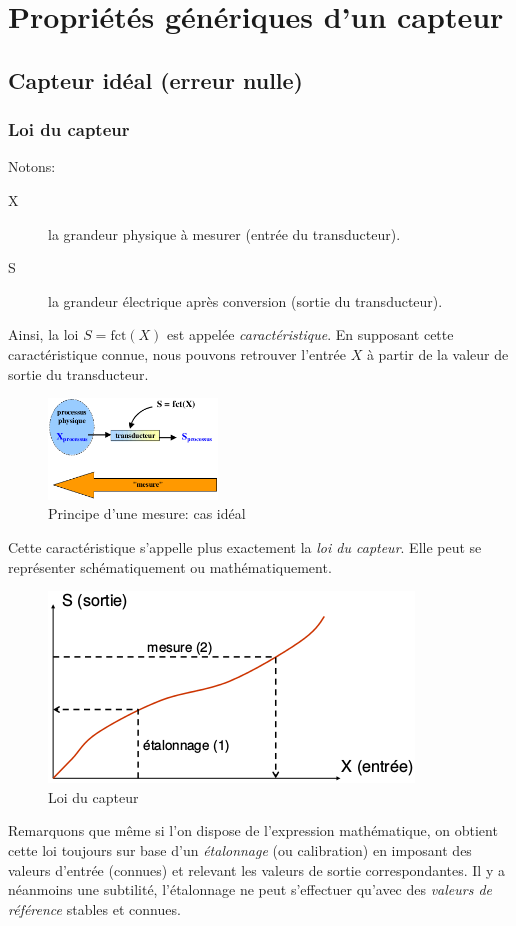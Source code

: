 \chapter{Propriétés génériques d'un capteur}
\section{Capteur idéal (erreur nulle)}
\subsection{Loi du capteur}
Notons:
\begin{description}
	\item[X] la grandeur physique à mesurer (entrée du transducteur).
	\item[S] la grandeur électrique après conversion (sortie du transducteur).
\end{description}
Ainsi, la loi \(S=\text{fct}(X)\) est appelée \emph{caractéristique}. En supposant cette caractéristique connue, nous pouvons retrouver l'entrée \(X\) à partir de la valeur de sortie du transducteur.
\begin{figure}[H] 
	\centering 
	\includegraphics[width=0.4\textwidth]{ch2/image1} 
	\caption{Principe d'une mesure: cas idéal}
\end{figure} 
Cette caractéristique s'appelle plus exactement la \emph{loi du capteur}. Elle peut se représenter schématiquement ou mathématiquement. 
\begin{figure}[H] 
	\centering 
	\includegraphics[width=.5\textwidth]{ch2/image2} 
	\caption{Loi du capteur}
\end{figure}
Remarquons que même si l'on dispose de l'expression mathématique, on obtient cette loi toujours sur base d'un \emph{étalonnage} (ou calibration) en imposant des valeurs d'entrée (connues) et relevant les valeurs de sortie correspondantes. Il y a néanmoins une subtilité, l'étalonnage ne peut s'effectuer qu'avec des \emph{valeurs de référence} stables et connues.\\

